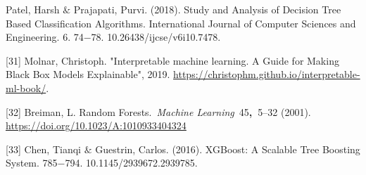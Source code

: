 \documentclass[11pt]{article}
\begin{document}
\begin{itemize}
[30] Patel, Harsh $\&$ Prajapati, Purvi. (2018). Study and Analysis of Decision Tree Based Classification Algorithms. International Journal of Computer Sciences and Engineering. 6. 74$-$78. 10.26438/ijcse/v6i10.7478. 

[31] Molnar, Christoph. "Interpretable machine learning. A Guide for Making Black Box Models Explainable", 2019. \url{https://christophm.github.io/interpretable-ml-book/}.

[32] \textcolor[HTML]{333333}{Breiman, L. Random Forests. \textit{Machine Learning} 45\textbf{, }5–32 (2001). \url{https://doi.org/10.1023/A:1010933404324} }

[33] Chen, Tianqi $\&$ Guestrin, Carlos. (2016). XGBoost: A Scalable Tree Boosting System. 785$-$794. 10.1145/2939672.2939785. \end{itemize}
\end{document}
